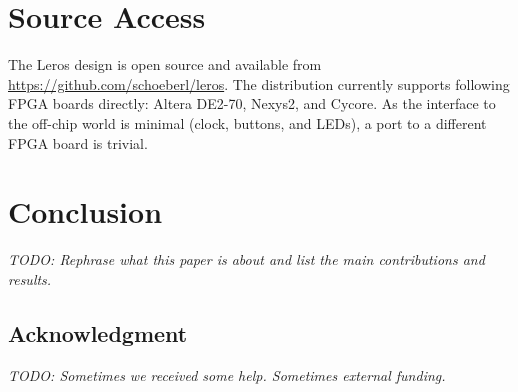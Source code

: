\documentclass[a4paper,fontsize=10pt,twoside,DIV15,BCOR12mm,headinclude=true,footinclude=false,pagesize,bibtotoc]{scrbook}
\newcommand{\todo}[1]{{\emph{TODO: #1}}}
\begin{document}

\section*{Source Access}

The Leros design is open source and available from \url{https://github.com/schoeberl/leros}. The distribution currently supports following FPGA boards directly: Altera DE2-70, Nexys2, and Cycore. As the interface to the off-chip world is minimal (clock, buttons, and LEDs), a port to a different FPGA board is trivial.


\section{Conclusion}
\label{sec:conclusion}

\todo{Rephrase what this paper is about and list the main contributions and results.}

\subsection*{Acknowledgment}

\todo{Sometimes we received some help. Sometimes external funding.}





\end{document}
